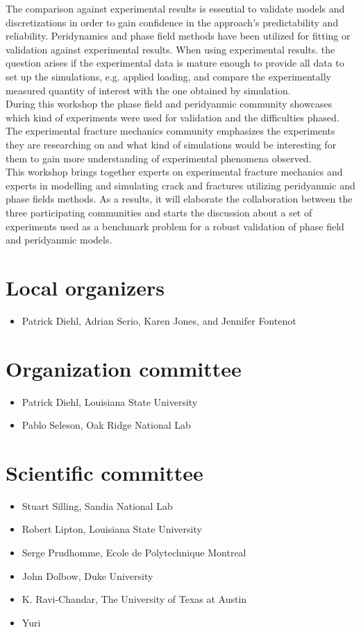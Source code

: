 The comparison against experimental results is essential to validate models and discretizations in order to gain confidence in the approach’s predictability and reliability. Peridynamics and phase field methods have been utilized for fitting or validation against experimental results. When using experimental results. the question arises if the experimental data is mature enough to provide all data to set up the simulations, e.g. applied loading, and compare the experimentally measured quantity of interest with the one obtained by simulation. \\

During this workshop the phase field and peridyanmic community showcases which kind of experiments were used for validation and the difficulties phased. The experimental fracture mechanics community emphasizes the experiments they are researching on and what kind of simulations would be interesting for them to gain more understanding of experimental phenomena observed. \\

This workshop brings together experts on experimental fracture mechanics and experts in modelling and simulating crack and fractures utilizing peridyanmic and phase fields methods. As a results, it will elaborate the collaboration between the three participating communities and starts the discussion about a set of experiments used as a benchmark problem for a robust validation of phase field and peridyanmic models.



\section*{Local organizers}
\begin{itemize}
    \item Patrick Diehl, Adrian Serio, Karen Jones, and Jennifer Fontenot 
\end{itemize}

\section*{Organization committee }
\begin{itemize}
\item Patrick Diehl, Louisiana State University
\item Pablo Seleson, Oak Ridge National Lab
\end{itemize}

\section*{Scientific committee}
\begin{itemize}
\item Stuart Silling, Sandia National Lab
\item Robert Lipton, Louisiana State University
\item Serge Prudhomme, Ecole de Polytechnique Montreal
\item John Dolbow, Duke University
\item K. Ravi-Chandar, The University of Texas at Austin
\item Yuri
\end{itemize}
